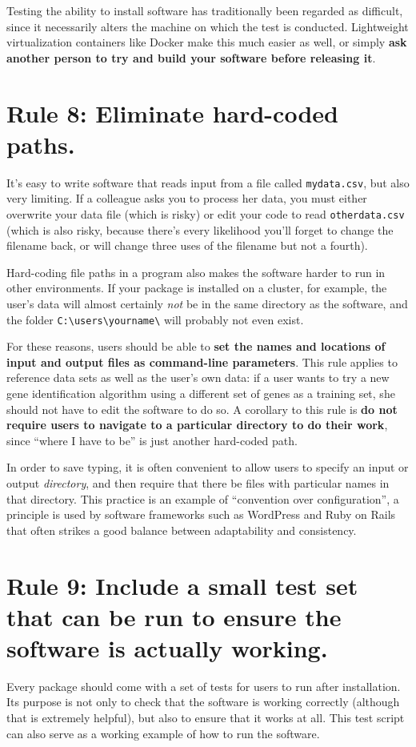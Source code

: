 \documentclass[10pt,letterpaper]{article}
\newcommand{\rulemajor}[1]{\section{#1}}
\newcommand{\ruleminor}[1]{\textbf{#1}}
\begin{document}
Testing the ability to install software has traditionally been
regarded as difficult, since it necessarily alters the machine on
which the test is conducted.  Lightweight virtualization containers
like Docker make this much easier as well, or simply \ruleminor{ask
another person to try and build your software before releasing it}.

\rulemajor{Rule 8: Eliminate hard-coded paths.}

It's easy to write software that reads input from a file called
\texttt{mydata.csv}, but also very limiting. If a colleague asks you
to process her data, you must either overwrite your data file (which
is risky) or edit your code to read \texttt{otherdata.csv} (which is
also risky, because there's every likelihood you'll forget to change
the filename back, or will change three uses of the filename but not a
fourth).

Hard-coding file paths in a program also makes the software harder to
run in other environments. If your package is installed on a cluster,
for example, the user's data will almost certainly \emph{not} be in
the same directory as the software, and the folder
\texttt{C:\textbackslash{}users\textbackslash{}yourname\textbackslash{}}
will probably not even exist.

For these reasons, users should be able to \ruleminor{set the names
and locations of input and output files as command-line parameters}.
This rule applies to reference data sets as well as the user's own
data: if a user wants to try a new gene identification algorithm using
a different set of genes as a training set, she should not have to
edit the software to do so.  A corollary to this rule is \ruleminor{do
not require users to navigate to a particular directory to do their
work}, since ``where I have to be'' is just another hard-coded path.

In order to save typing, it is often convenient to allow users to
specify an input or output \emph{directory}, and then require that
there be files with particular names in that directory. This practice
is an example of ``convention over configuration'', a principle is
used by software frameworks such as WordPress and Ruby on Rails that
often strikes a good balance between adaptability and consistency.

\rulemajor{Rule 9: Include a small test set that can be run to ensure the software is actually working.}

Every package should come with a set of tests for users to run after
installation. Its purpose is not only to check that the software is
working correctly (although that is extremely helpful), but also to
ensure that it works at all. This test script can also serve as a
working example of how to run the software.
\end{document}
